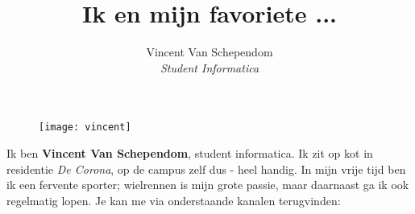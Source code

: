 \documentclass{article}
\title{Ik en mijn favoriete ...}
\author{Vincent Van Schependom
	\\ \textit{Student Informatica}}
\date{}
\begin{document}
	
	\maketitle
	
	\begin{figure}[h]
		\centering
		\texttt{[image: vincent]}
	\end{figure}
	
	Ik ben \textbf{Vincent Van Schependom}, student informatica. Ik zit op kot in residentie \textit{De Corona}, op de campus zelf dus - heel handig. In mijn vrije tijd ben ik een fervente sporter; wielrennen is mijn grote passie, maar daarnaast ga ik ook regelmatig lopen. Je kan me via onderstaande kanalen terugvinden:
\end{document}

